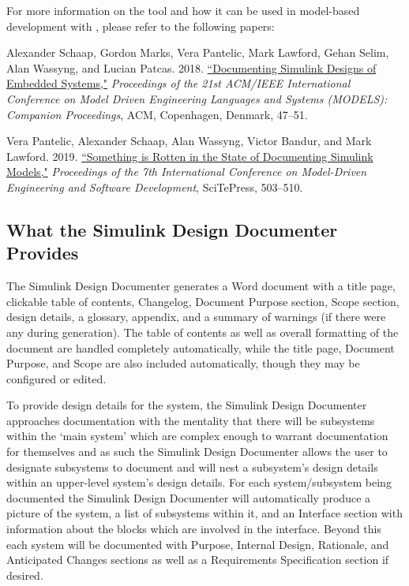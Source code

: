 \documentclass{article}
\makeatletter
\newcommand{\ToolName}{Simulink Design Documenter\@\xspace}
\makeatother
\begin{document}
For more information on the tool and how it can be used in model-based development with \Simulink, please refer to the following papers:

\vspace{1em}
Alexander Schaap, Gordon Marks, Vera Pantelic, Mark Lawford, Gehan Selim, Alan Wassyng, and Lucian Patcas. 2018. \href{https://doi.org/10.1145/3270112.3270115}{``Documenting Simulink Designs of Embedded Systems,"} \textit{Proceedings of the 21st ACM/IEEE International Conference on Model Driven Engineering Languages and Systems (MODELS): Companion Proceedings}, ACM, Copenhagen, Denmark, 47--51.

\vspace{1em}
Vera Pantelic, Alexander Schaap, Alan Wassyng, Victor Bandur, and Mark Lawford. 2019. \href{https://dl.acm.org/doi/abs/10.5220/0007586005030510}{``Something is Rotten in the State of Documenting Simulink Models,"} \textit{Proceedings of the 7th International Conference on Model-Driven Engineering and Software Development}, SciTePress, 503--510.

\subsection{What the \ToolName Provides}

The \ToolName generates a Word document with a title page, clickable table of contents, Changelog,  Document Purpose section, Scope section, design details, a glossary, appendix, and a summary of warnings (if there were any during generation).
The table of contents as well as overall formatting of the document are handled completely automatically, while the title page, Document Purpose, and Scope are also included automatically, though they may be configured or edited.

To provide design details for the system, the \ToolName approaches documentation with the mentality that there will be subsystems within the `main system' which are complex enough to warrant documentation for themselves and as such the \ToolName allows the user to designate subsystems to document and will nest a subsystem's design details within an upper-level system's design details. 
For each system/subsystem being documented the \ToolName will automatically produce 
a picture of the system, a list of subsystems within it, and an Interface section with information about the blocks which are involved in the interface.
Beyond this each system will be documented with 
Purpose, Internal Design, Rationale, and Anticipated Changes sections 
as well as a Requirements Specification section if desired.
\end{document}
